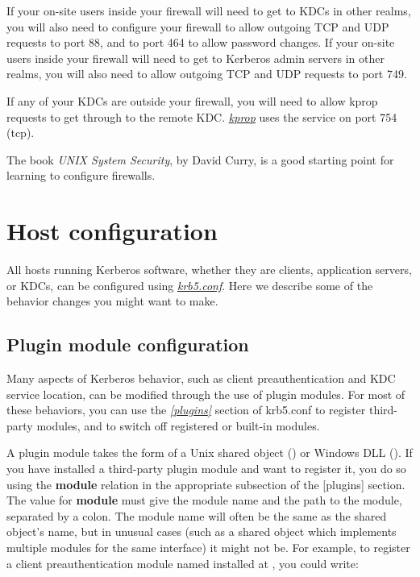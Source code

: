 \documentclass[letterpaper,10pt,english]{sphinxmanual}
\begin{document}
If your on-site users inside your firewall will need to get to KDCs in
other realms, you will also need to configure your firewall to allow
outgoing TCP and UDP requests to port 88, and to port 464 to allow
password changes.  If your on-site users inside your firewall will
need to get to Kerberos admin servers in other realms, you will also
need to allow outgoing TCP and UDP requests to port 749.

If any of your KDCs are outside your firewall, you will need to allow
kprop requests to get through to the remote KDC.  {\hyperref[admin/admin_commands/kprop:kprop-8]{\emph{kprop}}} uses
the  service on port 754 (tcp).

The book \emph{UNIX System Security}, by David Curry, is a good starting
point for learning to configure firewalls.


\chapter{Host configuration}
\label{admin/host_config:host-configuration}\label{admin/host_config::doc}
All hosts running Kerberos software, whether they are clients,
application servers, or KDCs, can be configured using
{\hyperref[admin/conf_files/krb5_conf:krb5-conf-5]{\emph{krb5.conf}}}.  Here we describe some of the behavior changes
you might want to make.


\section{Plugin module configuration}
\label{admin/host_config:plugin-config}\label{admin/host_config:plugin-module-configuration}
Many aspects of Kerberos behavior, such as client preauthentication
and KDC service location, can be modified through the use of plugin
modules.  For most of these behaviors, you can use the {\hyperref[admin/conf_files/krb5_conf:plugins]{\emph{{[}plugins{]}}}}
section of krb5.conf to register third-party modules, and to switch
off registered or built-in modules.

A plugin module takes the form of a Unix shared object
() or Windows DLL ().  If you have
installed a third-party plugin module and want to register it, you do
so using the \textbf{module} relation in the appropriate subsection of the
{[}plugins{]} section.  The value for \textbf{module} must give the module name
and the path to the module, separated by a colon.  The module name
will often be the same as the shared object's name, but in unusual
cases (such as a shared object which implements multiple modules for
the same interface) it might not be.  For example, to register a
client preauthentication module named  installed at
, you could write:
\end{document}
